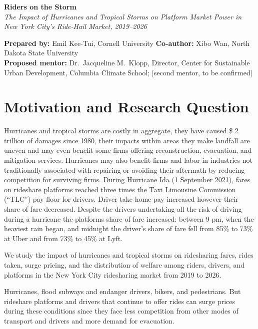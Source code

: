 \documentclass[11pt]{article}
\begin{document}
\doublespacing

\begin{center}
{\large\bfseries Riders on the Storm}\\[2pt]
{\itshape The Impact of Hurricanes and Tropical Storms on Platform Market Power in New York City's Ride-Hail Market, 2019--2026}
\end{center}

\noindent\textbf{Prepared by:} Emil Kee-Tui, Cornell University \textperiodcentered{} \textbf{Co-author:} Xibo Wan, North Dakota State University\\
\textbf{Proposed mentor:} Dr.\ Jacqueline M.\ Klopp, Director, Center for Sustainable Urban Development, Columbia Climate School; [second mentor, to be confirmed]

\section{Motivation and Research Question}

Hurricanes and tropical storms are costly in aggregate, they have caused \$ 2 trillion of damages since 1980, their impacts within areas they make landfall are uneven and may even benefit some firms offering reconstruction, evacuation, and mitigation services. Hurricanes may also benefit firms and labor in industries not traditionally associated with repairing or avoiding their aftermath by reducing competition for surviving firms. During Hurricane Ida (1 September 2021), fares on rideshare platforms reached three times the Taxi Limousine Commission (``TLC'') pay floor for drivers. Driver take home pay increased however their share of fare decreased. Despite the drivers undertaking all the risk of driving during a hurricane the platforms share of fare increased: between 9 pm, when the heaviest rain began, and midnight the driver's share of fare fell from 85\% to 73\% at Uber and from 73\% to 45\% at Lyft.

We study the impact of hurricanes and tropical storms on ridesharing fares, rides taken, surge pricing, and the distribution of welfare among riders, drivers, and platforms in the New York City ridesharing market from 2019 to 2026. 

Hurricanes, flood subways and endanger drivers, bikers, and pedestrians. But rideshare platforms and drivers that continue to offer rides can surge prices during these conditions since they face less competition from other modes of transport and drivers and more demand for evacuation. 
\end{document}

